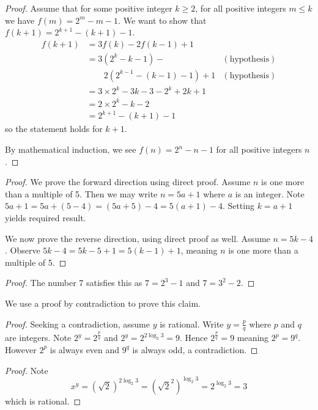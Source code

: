 \begin{questions}
\begin{proof}
        Assume that for some positive integer $k \geq 2$, for all positive integers $m \leq k$ we have $f(m) = 2^m - m - 1$. We want to show that $f(k+1) = 2^{k+1} - (k+1) - 1$.
        \begin{align*}
            f(k+1) &= 3f(k) - 2f(k-1) + 1\\
            &= 3(2^k - k - 1) - & (\text{hypothesis})\\
            &\quad\quad2(2^{k-1} - (k-1) - 1) + 1 & (\text{hypothesis}) \\
            &= 3\times 2^k - 3k - 3 -2^k + 2k + 1\\
            &= 2\times2^k - k - 2\\
            &= 2^{k+1} - (k+1) - 1
        \end{align*}
        so the statement holds for $k+1$.
        
        By mathematical induction, we see $f(n) = 2^n - n - 1$ for all positive integers $n$.    
    \end{proof}
    
    \item \begin{proof}
        We prove the forward direction using direct proof. Assume $n$ is one more than a multiple of 5. Then we may write $n = 5a + 1$ where $a$ is an integer. Note $5a + 1 = 5a + (5 - 4) = (5a + 5) - 4 = 5(a+1) - 4$. Setting $k = a+1$ yields required result.
    
        We now prove the reverse direction, using direct proof as well. Assume $n = 5k - 4$. Observe $5k - 4 = 5k - 5 + 1 = 5(k-1) + 1$, meaning $n$ is one more than a multiple of 5.
    \end{proof}
    
    \item \begin{proof}
        The number 7 satisfies this as $7 = 2^3 - 1$ and $7 = 3^2 - 2$.
    \end{proof}
    
    \item \begin{partquestions}{\roman*}
        \item We use a proof by contradiction to prove this claim.
        
        \begin{proof}
            Seeking a contradiction, assume $y$ is rational. Write $y = \frac pq$ where $p$ and $q$ are integers. Note $2^y = 2^{\frac pq}$ and $2^y = 2^{2\log_2{3}} = 9$. Hence $2^{\frac pq} = 9$ meaning $2^p = 9^q$. However $2^p$ is always even and $9^q$ is always odd, a contradiction.
        \end{proof}

        \item \begin{proof}
            Note
            \[
                x^y = (\sqrt2)^{2\log_2{3}} = \left(\sqrt{2}^2\right)^{\log_2{3}} = 2^{\log_2{3}} = 3        
            \]
            which is rational.
        \end{proof}
    \end{partquestions}
\end{questions}
